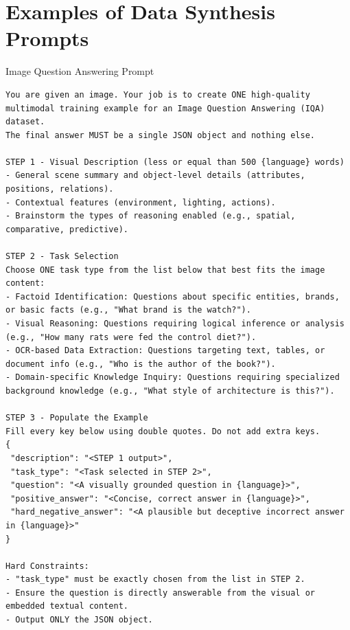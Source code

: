 \section{Examples of Data Synthesis Prompts}
\label{sec:data_synthesis_prompts}

\begin{promptblock}{Image Question Answering Prompt}
\begin{verbatim}
You are given an image. Your job is to create ONE high-quality multimodal training example for an Image Question Answering (IQA) dataset.
The final answer MUST be a single JSON object and nothing else.

STEP 1 - Visual Description (less or equal than 500 {language} words)
- General scene summary and object-level details (attributes, positions, relations).
- Contextual features (environment, lighting, actions).
- Brainstorm the types of reasoning enabled (e.g., spatial, comparative, predictive).

STEP 2 - Task Selection
Choose ONE task type from the list below that best fits the image content:
- Factoid Identification: Questions about specific entities, brands, or basic facts (e.g., "What brand is the watch?").
- Visual Reasoning: Questions requiring logical inference or analysis (e.g., "How many rats were fed the control diet?").
- OCR-based Data Extraction: Questions targeting text, tables, or document info (e.g., "Who is the author of the book?").
- Domain-specific Knowledge Inquiry: Questions requiring specialized background knowledge (e.g., "What style of architecture is this?").

STEP 3 - Populate the Example
Fill every key below using double quotes. Do not add extra keys.
{
 "description": "<STEP 1 output>",
 "task_type": "<Task selected in STEP 2>",
 "question": "<A visually grounded question in {language}>",
 "positive_answer": "<Concise, correct answer in {language}>",
 "hard_negative_answer": "<A plausible but deceptive incorrect answer in {language}>"
}

Hard Constraints:
- "task_type" must be exactly chosen from the list in STEP 2.
- Ensure the question is directly answerable from the visual or embedded textual content.
- Output ONLY the JSON object.
\end{verbatim}
\end{promptblock}

